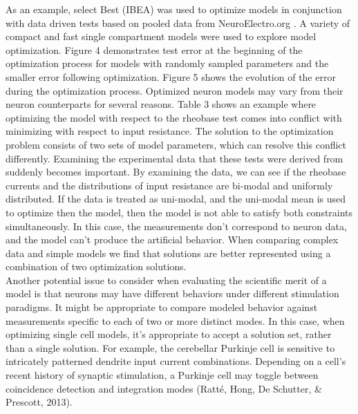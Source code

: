 As an example, select Best (IBEA) was used to optimize models in conjunction with data driven tests based on pooled data from NeuroElectro.org \cite{tripathy2014neuroelectro}. A variety of compact and fast single compartment models were used to explore model optimization. Figure 4 demonstrates test error at the beginning of the optimization process for models with randomly sampled parameters and the smaller error following optimization. Figure 5 shows the evolution of the error during the optimization process. \newline
\newline
Optimized neuron models may vary from their neuron counterparts for several reasons. Table 3 shows an example where optimizing the model with respect to the rheobase test comes into conflict with minimizing with respect to input resistance. The solution to the optimization problem consists of two sets of model parameters, which can resolve this conflict differently. Examining the experimental data that these tests were derived from suddenly becomes important. By examining the data, we can see if the rheobase currents and the distributions of input resistance are bi-modal and uniformly distributed. If the data is treated as uni-modal, and the uni-modal mean is used to optimize then the model, then the model is not able to satisfy both constraints simultaneously. In this case, the measurements don’t correspond to neuron data, and the model can’t produce the artificial behavior. When comparing complex data and simple models we find that solutions are better represented using a combination of two optimization solutions.\\

Another potential issue to consider when evaluating the scientific merit of a model is that neurons may have different behaviors under different stimulation paradigms. It might be appropriate to compare modeled behavior against measurements specific to each of two or more distinct modes. In this case, when optimizing single cell models, it’s appropriate to accept a solution set, rather than a single solution. For example, the cerebellar Purkinje cell is sensitive to intricately patterned dendrite input current combinations. Depending on a cell’s recent history of synaptic stimulation, a Purkinje cell may toggle between coincidence detection and integration modes (Ratté, Hong, De Schutter, \& Prescott, 2013).

